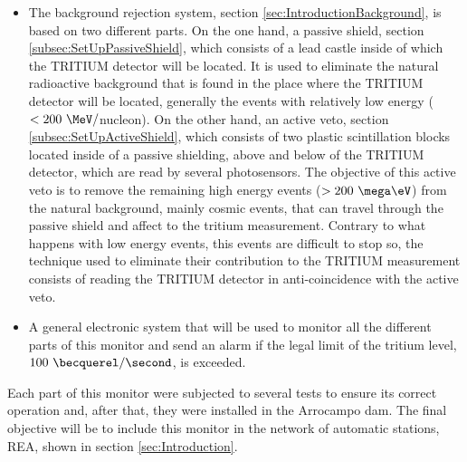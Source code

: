 \begin{itemize}
\item{} The background rejection system, section \ref{sec:IntroductionBackground}, is based on two different parts. On the one hand, a passive shield, section \ref{subsec:SetUpPassiveShield}, which consists of a lead castle inside of which the TRITIUM detector will be located. It is used to eliminate the natural radioactive background that is found in the place where the TRITIUM detector will be located, generally the events with relatively low energy ($<200~\MeV/$nucleon). On the other hand, an active veto, section \ref{subsec:SetUpActiveShield}, which consists of two plastic scintillation blocks located inside of a passive shielding, above and below of the TRITIUM detector, which are read by several photosensors. The objective of this active veto is to remove the remaining high energy events ($>200~\mega\eV$) from the natural background, mainly cosmic events, that can travel through the passive shield and affect to the tritium measurement. Contrary to what happens with low energy events, this events are difficult to stop so, the technique used to eliminate their contribution to the TRITIUM measurement consists of reading the TRITIUM detector in anti-coincidence with the active veto.

\item{} A general electronic system that will be used to monitor all the different parts of this monitor and send an alarm if the legal limit of the tritium level, $100~\becquerel/\second$, is exceeded.

\end{itemize}

Each part of this monitor were subjected to several tests to ensure its correct operation and, after that, they were installed in the Arrocampo dam. The final objective will be to include this monitor in the network of automatic stations, REA, shown in section \ref{sec:Introduction}.